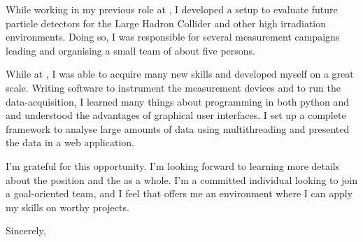 \documentclass[12pt]{extarticle}
\begin{document}
%
While working in my previous role at \@oldcomp, I developed a setup to evaluate future particle detectors for the Large Hadron Collider and other high irradiation environments.
Doing so, I was responsible for several measurement campaigns leading and organising a small team of about five persons.\par
%
While at \@oldcomp, I was able to acquire many new skills and developed myself on a great scale.
Writing software to instrument the measurement devices and to run the data-acquisition, I learned many things about programming in both python and \cpp and understood the advantages of graphical user interfaces.
I set up a complete framework to analyse large amounts of data using multithreading and presented the data in a web application.\par
%
I'm grateful for this opportunity.
I'm looking forward to learning more details about the \@positionshort position and the \@company as a whole.
I'm a committed individual looking to join a goal-oriented team, and I feel that \@company offers me an environment where I can apply my skills on worthy projects.\par
%
Sincerely,\par
%
\@author
%
\end{document}
